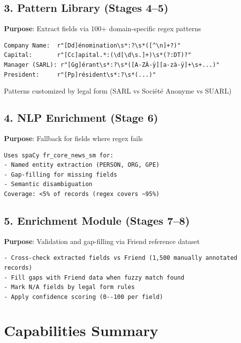 \documentclass[12pt,a4paper]{report}
\begin{document}
\subsection{3. Pattern Library (Stages 4--5)}

\textbf{Purpose}: Extract fields via 100+ domain-specific regex patterns

\begin{verbatim}
Company Name:  r"[Dd]énomination\s*:?\s*([^\n]+?)"
Capital:       r"[Cc]apital.*:(\d[\d\s.]+)\s*(?:DT)?"
Manager (SARL): r"[Gg]érant\s*:?\s*([A-ZÀ-ÿ][a-zà-ÿ]+\s+...)"
President:     r"[Pp]résident\s*:?\s*(...)"
\end{verbatim}

Patterns customized by legal form (SARL vs Société Anonyme vs SUARL)

\subsection{4. NLP Enrichment (Stage 6)}

\textbf{Purpose}: Fallback for fields where regex fails

\begin{verbatim}
Uses spaCy fr_core_news_sm for:
- Named entity extraction (PERSON, ORG, GPE)
- Gap-filling for missing fields
- Semantic disambiguation
Coverage: <5% of records (regex covers ~95%)
\end{verbatim}

\subsection{5. Enrichment Module (Stages 7--8)}

\textbf{Purpose}: Validation and gap-filling via Friend reference dataset

\begin{verbatim}
- Cross-check extracted fields vs Friend (1,500 manually annotated records)
- Fill gaps with Friend data when fuzzy match found
- Mark N/A fields by legal form rules
- Apply confidence scoring (0--100 per field)
\end{verbatim}

\section{Capabilities Summary}
\end{document}
